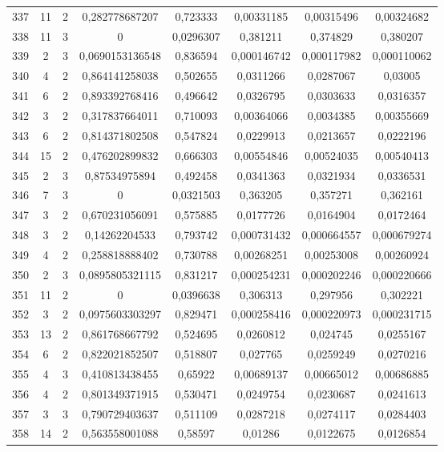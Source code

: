 \begin{longtable}{|c|c|c|c|c|c|c|c|}
337 & 11 & 2 & 0,282778687207 & 0,723333 & 0,00331185 & 0,00315496 & 0,00324682  \\
338 & 11 & 3 & 0 & 0,0296307 & 0,381211 & 0,374829 & 0,380207  \\
339 & 2 & 3 & 0,0690153136548 & 0,836594 & 0,000146742 & 0,000117982 & 0,000110062  \\
340 & 4 & 2 & 0,864141258038 & 0,502655 & 0,0311266 & 0,0287067 & 0,03005  \\
341 & 6 & 2 & 0,893392768416 & 0,496642 & 0,0326795 & 0,0303633 & 0,0316357  \\
342 & 3 & 2 & 0,317837664011 & 0,710093 & 0,00364066 & 0,0034385 & 0,00355669  \\
343 & 6 & 2 & 0,814371802508 & 0,547824 & 0,0229913 & 0,0213657 & 0,0222196  \\
344 & 15 & 2 & 0,476202899832 & 0,666303 & 0,00554846 & 0,00524035 & 0,00540413  \\
345 & 2 & 3 & 0,87534975894 & 0,492458 & 0,0341363 & 0,0321934 & 0,0336531  \\
346 & 7 & 3 & 0 & 0,0321503 & 0,363205 & 0,357271 & 0,362161  \\
347 & 3 & 2 & 0,670231056091 & 0,575885 & 0,0177726 & 0,0164904 & 0,0172464  \\
348 & 3 & 2 & 0,14262204533 & 0,793742 & 0,000731432 & 0,000664557 & 0,000679274  \\
349 & 4 & 2 & 0,258818888402 & 0,730788 & 0,00268251 & 0,00253008 & 0,00260924  \\
350 & 2 & 3 & 0,0895805321115 & 0,831217 & 0,000254231 & 0,000202246 & 0,000220666  \\
351 & 11 & 2 & 0 & 0,0396638 & 0,306313 & 0,297956 & 0,302221  \\
352 & 3 & 2 & 0,0975603303297 & 0,829471 & 0,000258416 & 0,000220973 & 0,000231715  \\
353 & 13 & 2 & 0,861768667792 & 0,524695 & 0,0260812 & 0,024745 & 0,0255167  \\
354 & 6 & 2 & 0,822021852507 & 0,518807 & 0,027765 & 0,0259249 & 0,0270216  \\
355 & 4 & 3 & 0,410813438455 & 0,65922 & 0,00689137 & 0,00665012 & 0,00686885  \\
356 & 4 & 2 & 0,801349371915 & 0,530471 & 0,0249754 & 0,0230687 & 0,0241613  \\
357 & 3 & 3 & 0,790729403637 & 0,511109 & 0,0287218 & 0,0274117 & 0,0284403  \\
358 & 14 & 2 & 0,563558001088 & 0,58597 & 0,01286 & 0,0122675 & 0,0126854  \\

\end{longtable}

